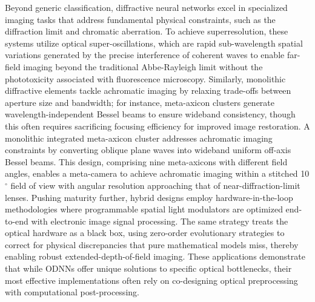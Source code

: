 \documentclass[11pt]{article}
\begin{document}
Beyond generic classification, diffractive neural networks excel in specialized imaging tasks that address fundamental physical constraints, such as the diffraction limit and chromatic aberration. To achieve superresolution, these systems utilize optical super-oscillations, which are rapid sub-wavelength spatial variations generated by the precise interference of coherent waves to enable far-field imaging beyond the traditional Abbe-Rayleigh limit without the phototoxicity associated with fluorescence microscopy. \citep{doi_10_1117_12_2576293_e7634e1d} \citep{doi_10_1109_cleo_europe_eqec57999_2023_10231830_c702ffd4} Similarly, monolithic diffractive elements tackle achromatic imaging by relaxing trade-offs between aperture size and bandwidth; for instance, meta-axicon clusters generate wavelength-independent Bessel beams to ensure wideband consistency, though this often requires sacrificing focusing efficiency for improved image restoration. A monolithic integrated meta-axicon cluster addresses achromatic imaging constraints by converting oblique plane waves into wideband uniform off-axis Bessel beams. This design, comprising nine meta-axicons with different field angles, enables a meta-camera to achieve achromatic imaging within a stitched 10 \(^\circ\) field of view with angular resolution approaching that of near-diffraction-limit lenses. \citep{doi_10_1038_s41377_026_02272_y_42e58df2} Pushing maturity further, hybrid designs employ hardware-in-the-loop methodologies where programmable spatial light modulators are optimized end-to-end with electronic image signal processing. The same strategy treats the optical hardware as a black box, using zero-order evolutionary strategies to correct for physical discrepancies that pure mathematical models miss, thereby enabling robust extended-depth-of-field imaging. \citep{doi_10_1364_oe_461549_b2d41b3f} These applications demonstrate that while ODNNs offer unique solutions to specific optical bottlenecks, their most effective implementations often rely on co-designing optical preprocessing with computational post-processing. \citep{doi_10_1117_1_ap_6_5_056004_3f240d06} \citep{doi_10_1038_s41377_026_02272_y_42e58df2} \citep{doi_10_1364_oe_461549_b2d41b3f}
\end{document}
